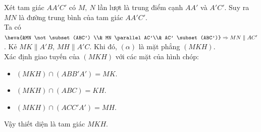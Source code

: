 \begin{ex}
{\begin{itemchoice}
			\itemch Xét tam giác $AA'C'$ có $M,~ N$ lần lượt là trung điểm cạnh $AA'$ và $A'C'$. Suy ra $MN$ là đường trung bình của tam giác $AA'C'$. \\
			Ta có $\heva{&MN \not\subset (ABC') \\& MN \parallel AC'\\& AC' \subset (ABC')} \Rightarrow MN \parallel AC'$.
			\itemch Kẻ $MK \parallel A'B$, $MH \parallel A'C$. Khi đó, $(\alpha)$ là mặt phẳng $(MKH)$.\\
			Xác định giao tuyến của $(MKH)$ với các mặt của hình chóp:
			\begin{itemize}
				\item $(MKH) \cap (ABB'A')=MK$.
				\item $(MKH) \cap (ABC)=KH$.
				\item $(MKH) \cap (ACC'A')=MH$.
			\end{itemize}
			Vậy thiết diện là tam giác $MKH$.
		\end{itemchoice}
	}
\end{ex}

